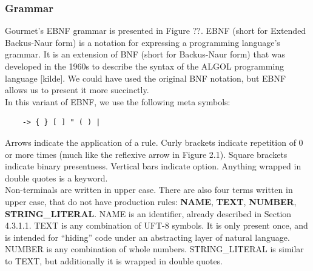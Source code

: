 \subsubsection{Grammar}

Gourmet's EBNF grammar is presented in Figure ??. EBNF (short for Extended Backus-Naur form) is a notation for expressing a programming language's grammar. It is an extension of BNF (short for Backus-Naur form) that was developed in the 1960s to describe the syntax of the ALGOL programming language [kilde]. We could have used the original BNF notation, but EBNF allows us to present it more succinctly. \hfill \\

In this variant of EBNF, we use the following meta symbols:

\begin{lstlisting}
    -> { } [ ] " ( ) |
\end{lstlisting}

Arrows indicate the application of a rule. Curly brackets indicate repetition of 0 or more times (much like the reflexive arrow in Figure 2.1). Square brackets indicate binary presentness. Vertical bars indicate option. Anything wrapped in double quotes is a keyword. \hfill \\

Non-terminals are written in upper case. There are also four terms written in upper case, that do not have production rules: \textbf{NAME}, \textbf{TEXT}, \textbf{NUMBER}, \textbf{STRING\_LITERAL}. NAME is an identifier, already described in Section 4.3.1.1. TEXT is any combination of UFT-8 symbols. It is only present once, and is intended for ``hiding'' code under an abstracting layer of natural language. NUMBER is any combination of whole numbers. STRING\_LITERAL is similar to TEXT, but additionally it is wrapped in double quotes. \hfill \\


